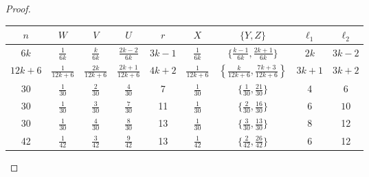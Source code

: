 \documentclass[12pt]{article}
\theoremstyle{definition} \newtheorem*{definition}              {Definition}
\theoremstyle{definition} \newtheorem {remark}                   {Remark}
\theoremstyle{definition} \newtheorem*{problem}                {Problem}
\theoremstyle{definition} \newtheorem{example}     [thm]{Example}
\begin{document}
\begin{proof}
\bigskip
\noindent
\renewcommand{\arraystretch}{1.5}
\begin{tabular}{||c|ccc|c|cc|cc||}
\hline
$n$ & $W$ & $V$ & $U$ &  $r$ & $X$ & $\{ Y,Z\}$ & $\ell _1$ &  $\ell _2$ \\
\hline
\hline
$6k$ & $\frac{1}{6k}$ & $\frac{k}{6k}$ & $\frac{2k-2}{6k}$ & $3k-1$ & 
$\frac{1}{6k}$ & $\{ \frac{k-1}{6k}, \frac{2k+1}{6k}\} $ &  $2k$ &  $3k-2$ \\[4pt]
\hline
$12k+6$ & $\frac{1}{12k+6} $ & $\frac{2k}{12k+6} $ & $\frac{2k+1}{12k+6} $ & 
$4k+2$ & $\frac{1}{12k+6} $ & $\left\{ \frac{k}{12k+6}, \frac{7k+3}{12k+6}\right\} $ & 
$3k+1$ & $3k+2$ \\[4pt]
\hline
30 & $\frac{1}{30}$ & $\frac{2}{30}$ & $\frac{4}{30}$ & 7 & $\frac{1}{30}$ & 
$\{ \frac{1}{30} , \frac{21}{30} \}$ & 4 & $6$ \\
30 & $\frac{1}{30}$ & $\frac{3}{30}$  & $\frac{7}{30}$ & 11 & $\frac{1}{30}$ & 
$\{ \frac{2}{30} , \frac{16}{30} \}$ & 6 & $10$ \\
30 & $\frac{1}{30}$  & $\frac{4}{30}$ & $\frac{8}{30}$ & 13& $\frac{1}{30}$ & 
$\{ \frac{3}{30} , \frac{13}{30} \}$ & 8 & 12 \\[4pt]
\hline
42 & $\frac{1}{42}$ & $\frac{3}{42}$  & $\frac{9}{42}$ & 13 & $\frac{1}{42}$ & 
$\{ \frac{2}{42}, \frac{26}{42} \}$ & 6 & 12 \\[4pt]
\hline
\end{tabular}


\end{proof}
\end{document}
